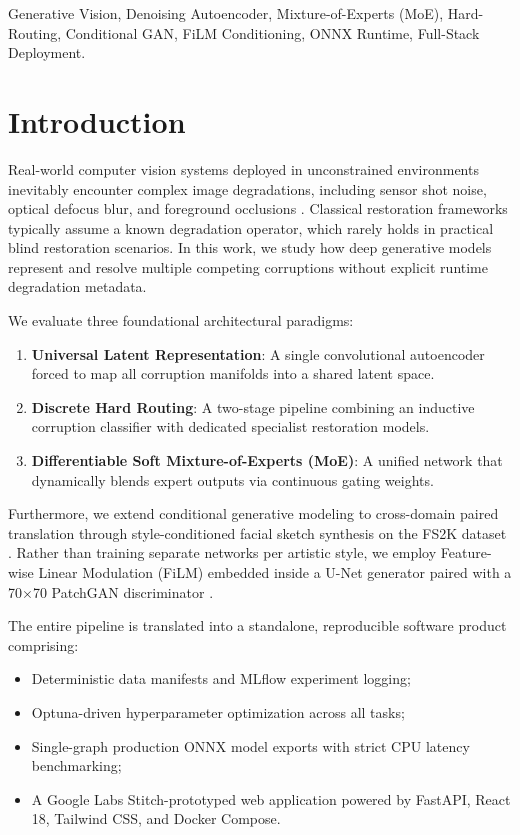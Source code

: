 \documentclass[conference]{IEEEtran}
\begin{document}
\begin{IEEEkeywords}
Generative Vision, Denoising Autoencoder, Mixture-of-Experts (MoE), Hard-Routing, Conditional GAN, FiLM Conditioning, ONNX Runtime, Full-Stack Deployment.
\end{IEEEkeywords}

\section{Introduction}
Real-world computer vision systems deployed in unconstrained environments inevitably encounter complex image degradations, including sensor shot noise, optical defocus blur, and foreground occlusions \cite{wang2004image}. Classical restoration frameworks typically assume a known degradation operator, which rarely holds in practical blind restoration scenarios. In this work, we study how deep generative models represent and resolve multiple competing corruptions without explicit runtime degradation metadata.

We evaluate three foundational architectural paradigms:
\begin{enumerate}
    \item \textbf{Universal Latent Representation}: A single convolutional autoencoder forced to map all corruption manifolds into a shared latent space.
    \item \textbf{Discrete Hard Routing}: A two-stage pipeline combining an inductive corruption classifier with dedicated specialist restoration models.
    \item \textbf{Differentiable Soft Mixture-of-Experts (MoE)}: A unified network that dynamically blends expert outputs via continuous gating weights.
\end{enumerate}

Furthermore, we extend conditional generative modeling to cross-domain paired translation through style-conditioned facial sketch synthesis on the FS2K dataset \cite{chen2021fs2k}. Rather than training separate networks per artistic style, we employ Feature-wise Linear Modulation (FiLM) \cite{perez2018film} embedded inside a U-Net generator \cite{ronneberger2015u} paired with a 70$\times$70 PatchGAN discriminator \cite{isola2017image}.

The entire pipeline is translated into a standalone, reproducible software product comprising:
\begin{itemize}
    \item Deterministic data manifests and MLflow experiment logging;
    \item Optuna-driven hyperparameter optimization across all tasks;
    \item Single-graph production ONNX model exports with strict CPU latency benchmarking;
    \item A Google Labs Stitch-prototyped web application powered by FastAPI, React 18, Tailwind CSS, and Docker Compose.
\end{itemize}
\end{document}
